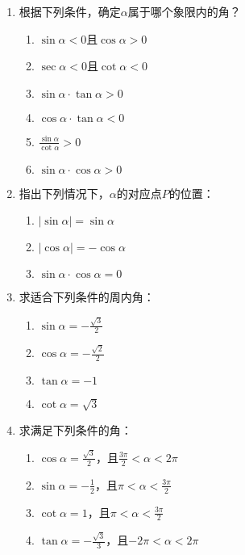 \begin{enumerate}
    \item 根据下列条件，确定$\alpha$属于哪个象限内的角？
 \begin{multicols}{2}
\begin{enumerate}[(1)]
    \item $\sin\alpha<0$且$\cos\alpha>0$
    \item $\sec\alpha<0$且$\cot\alpha<0$
    \item $\sin\alpha\cdot \tan\alpha>0$
    \item $\cos\alpha\cdot \tan\alpha<0$
    \item $\frac{\sin\alpha}{\cot\alpha}>0$
    \item $\sin\alpha\cdot \cos\alpha>0$
\end{enumerate}
 \end{multicols}
 \item    指出下列情况下，$\alpha$的对应点$P$的位置：
 \begin{multicols}{2}
\begin{enumerate}[(1)]
    \item $|\sin\alpha|=\sin\alpha$
    \item $|\cos\alpha|=-\cos\alpha$
    \item $\sin\alpha\cdot \cos\alpha=0$
\end{enumerate}
 \end{multicols}
 \item    求适合下列条件的周内角：
 \begin{multicols}{2}
\begin{enumerate}[(1)]
    \item $\sin\alpha=-\frac{\sqrt{3}}{2}$
    \item $\cos\alpha=-\frac{\sqrt{2}}{2}$
    \item $\tan\alpha=-1$
    \item $\cot\alpha=\sqrt{3}$
\end{enumerate}
 \end{multicols}
 \item    求满足下列条件的角：
 \begin{multicols}{2}
\begin{enumerate}[(1)]
    \item $\cos\alpha=\frac{\sqrt{3}}{2}$，且$\frac{3\pi}{2}<\alpha<2\pi$
    \item $\sin\alpha=-\frac{1}{2}$，且$\pi<\alpha<\frac{3\pi}{2}$
    \item $\cot\alpha=1$，且$\pi<\alpha<\frac{3\pi}{2}$
    \item $\tan\alpha=-\frac{\sqrt{3}}{3}$，且$-2\pi<\alpha<2\pi$
\end{enumerate}
 \end{multicols}


\end{enumerate}
